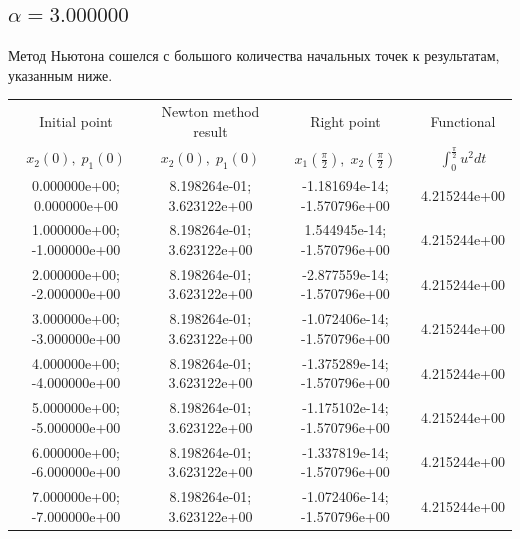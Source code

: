 \documentclass[titlepage]{article}
\def\l{\left}
\def\r{\right}
\begin{document}
\subsection{$\alpha = 3.000000$} 
Метод Ньютона сошелся с большого количества начальных точек к результатам, указанным ниже. \\ 
\begin{tabular}{ | c | c | c | c |} 
\hline 
Initial point  & Newton method result & Right point & Functional 
 \\ $x_2(0), \; p_1(0)$ & $x_2(0), \; p_1(0)$ & $x_1\l(\frac{\pi}{2}\r), \; x_2\l(\frac{\pi}{2}\r)$ & $\int_{0}^{\frac{\pi}{2}}u^2dt$  \\ \hline 
0.000000e+00; 0.000000e+00 & 8.198264e-01; 3.623122e+00 & -1.181694e-14; -1.570796e+00 & 4.215244e+00 \\ \hline 
1.000000e+00; -1.000000e+00 & 8.198264e-01; 3.623122e+00 & 1.544945e-14; -1.570796e+00 & 4.215244e+00 \\ \hline 
2.000000e+00; -2.000000e+00 & 8.198264e-01; 3.623122e+00 & -2.877559e-14; -1.570796e+00 & 4.215244e+00 \\ \hline 
3.000000e+00; -3.000000e+00 & 8.198264e-01; 3.623122e+00 & -1.072406e-14; -1.570796e+00 & 4.215244e+00 \\ \hline 
4.000000e+00; -4.000000e+00 & 8.198264e-01; 3.623122e+00 & -1.375289e-14; -1.570796e+00 & 4.215244e+00 \\ \hline 
5.000000e+00; -5.000000e+00 & 8.198264e-01; 3.623122e+00 & -1.175102e-14; -1.570796e+00 & 4.215244e+00 \\ \hline 
6.000000e+00; -6.000000e+00 & 8.198264e-01; 3.623122e+00 & -1.337819e-14; -1.570796e+00 & 4.215244e+00 \\ \hline 
7.000000e+00; -7.000000e+00 & 8.198264e-01; 3.623122e+00 & -1.072406e-14; -1.570796e+00 & 4.215244e+00 \\ \hline 
\end{tabular} 
\end{document}
